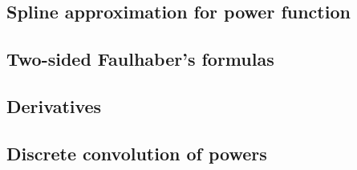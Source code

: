 \subsection{Spline approximation for power function}
\label{subsec:spline-approximation-for-power-function}


\subsection{Two-sided Faulhaber's formulas}
\label{subsec:two-sided-faulhaber's-formulas}


\subsection{Derivatives}
\label{subsec:derivatives}


\subsection{Discrete convolution of powers}\label{subsec:discrete-convolution-of-powers}

